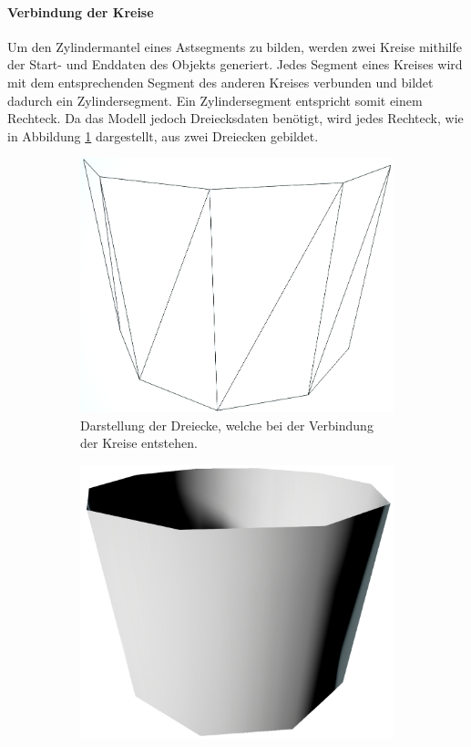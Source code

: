 \paragraph{Verbindung der Kreise}
Um den Zylindermantel eines Astsegments zu bilden, werden zwei Kreise mithilfe der Start- und Enddaten des Objekts generiert. Jedes Segment eines Kreises wird mit dem entsprechenden Segment des anderen Kreises verbunden und bildet dadurch ein Zylindersegment. Ein Zylindersegment entspricht somit einem Rechteck. Da das Modell jedoch Dreiecksdaten benötigt, wird jedes Rechteck, wie in Abbildung \ref{subfig:Zylinder10SegmenteWireframe} dargestellt, aus zwei Dreiecken gebildet. \cite{ModelingByNumbersZylindersA:13}
\begin{figure} [hbtp]
\centering
\begin{subfigure}[t]{.4\textwidth}
	\centering
	\includegraphics[height=.75\linewidth]{images/Zylinder10SegmenteWireframe.png}
	\caption{Darstellung der Dreiecke, welche bei der Verbindung der Kreise entstehen.}
	\label{subfig:Zylinder10SegmenteWireframe}
\end{subfigure}
\hspace{.1\textwidth}
\begin{subfigure}[t]{.4\textwidth}
	\centering
	\includegraphics[height=.75\linewidth]{images/Zylinder10SegmenteOpaque.png}

\end{subfigure}
\end{figure}

